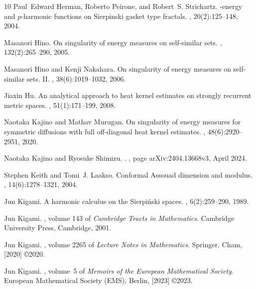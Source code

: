 \documentclass[11pt,a4paper]{article}
\numberwithin{equation}{section}
\theoremstyle{plain}
\theoremstyle{definition}
\begin{document}
\begin{thebibliography}{10}
Paul~Edward Herman, Roberto Peirone, and Robert~S. Strichartz.
-energy and {$p$}-harmonic functions on {S}ierpinski gasket type
  fractals.
, 20(2):125--148, 2004.

Masanori Hino.
\newblock On singularity of energy measures on self-similar sets.
, 132(2):265--290, 2005.

Masanori Hino and Kenji Nakahara.
\newblock On singularity of energy measures on self-similar sets. {II}.
, 38(6):1019--1032, 2006.

Jiaxin Hu.
\newblock An analytical approach to heat kernel estimates on strongly recurrent
  metric spaces.
, 51(1):171--199, 2008.

Naotaka Kajino and Mathav Murugan.
\newblock On singularity of energy measures for symmetric diffusions with full
  off-diagonal heat kernel estimates.
, 48(6):2920--2951, 2020.

Naotaka {Kajino} and Ryosuke {Shimizu}.
.
, page arXiv:2404.13668v3, April 2024.

Stephen Keith and Tomi~J. Laakso.
\newblock Conformal {A}ssouad dimension and modulus.
, 14(6):1278--1321, 2004.

Jun Kigami.
\newblock A harmonic calculus on the {S}ierpi\'{n}ski spaces.
, 6(2):259--290, 1989.

Jun Kigami.
, volume 143 of {\em Cambridge Tracts in
  Mathematics}.
\newblock Cambridge University Press, Cambridge, 2001.

Jun Kigami.
,
  volume 2265 of {\em Lecture Notes in Mathematics}.
\newblock Springer, Cham, [2020] \copyright 2020.

Jun Kigami.
, volume~5 of {\em Memoirs of the European Mathematical
  Society}.
\newblock European Mathematical Society (EMS), Berlin, [2023] \copyright 2023.


\end{thebibliography}
\end{document}
